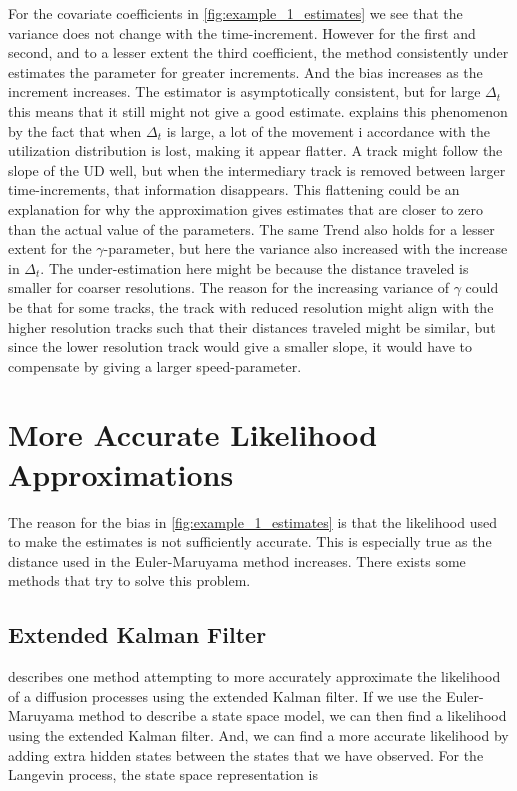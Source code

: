 For the covariate coefficients in \ref{fig:example_1_estimates} we see that the variance does not change with the time-increment. However for the first and second, and to a lesser extent the third coefficient, the method consistently under estimates the parameter for greater increments. And the bias increases as the increment increases. The estimator is asymptotically consistent, but for large $\Delta_t$ this means that it still might not give a good estimate. \cite{michelot_langevin_2019} explains this phenomenon by the fact that when $\Delta_t$ is large, a lot of the movement i accordance with the utilization distribution is lost, making it appear flatter. A track might follow the slope of the UD well, but when the intermediary track is removed between larger time-increments, that information disappears. This flattening could be an explanation for why the approximation gives estimates that are closer to zero than the actual value of the parameters. The same Trend also holds for a lesser extent for the $\gamma$-parameter, but here the variance also increased with the increase in $\Delta_t$. The under-estimation here might be because the distance traveled is smaller for coarser resolutions. The reason for the increasing variance of $\gamma$ could be that for some tracks, the track with reduced resolution might align with the higher resolution tracks such that their distances traveled might be similar, but since the lower resolution track would give a smaller slope, it would have to compensate by giving a larger speed-parameter.



\section{More Accurate Likelihood Approximations}
The reason for the bias in \ref{fig:example_1_estimates} is that the likelihood used to make the estimates is not sufficiently accurate. This is especially true as the distance used in the Euler-Maruyama method increases. There exists some methods that try to solve this problem. 


\subsection{Extended Kalman Filter}
\parencite{kulikov_extended_2024} describes one method attempting to more accurately approximate the likelihood of a diffusion processes using the extended Kalman filter. If we use the Euler-Maruyama method to describe a state space model, we can then find a likelihood using the extended Kalman filter. And, we can find a more accurate likelihood by adding extra hidden states between the states that we have observed. For the Langevin process, the state space representation is 

